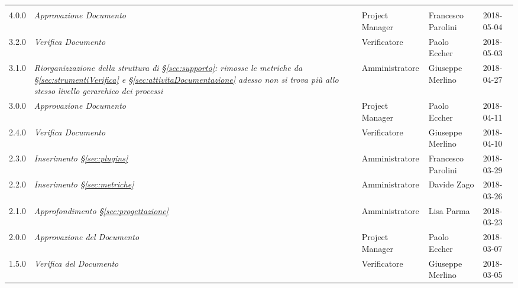 
\section*{}

\begin{longtable}[H]{C{2cm}|C{4cm}|C{3cm}|C{3cm}|R{2cm}}

		
		
			 &  & &  & \\
		
		
		4.0.0  & \emph{Approvazione Documento} & Project Manager & Francesco Parolini &  2018-05-04 \\
		\hline

		3.2.0  & \emph{Verifica Documento} & Verificatore & Paolo Eccher &  2018-05-03 \\
		\hline

		3.1.0  & \emph{Riorganizzazione della struttura di §\ref{sec:supporto}: rimosse le metriche da §\ref{sec:strumentiVerifica} e §\ref{sec:attivitaDocumentazione} adesso non si trova più allo stesso livello gerarchico dei processi  } & Amministratore & Giuseppe Merlino &  2018-04-27 \\
		\hline
				
		3.0.0  & \emph{Approvazione Documento} & Project Manager & Paolo Eccher &  2018-04-11 \\
		\hline
		
			2.4.0  & \emph{Verifica Documento} & Verificatore & Giuseppe Merlino &  2018-04-10 \\
		\hline
		
		2.3.0  & \emph{Inserimento §\ref{sec:plugins}} & Amministratore & Francesco Parolini &  2018-03-29 \\
		\hline

		2.2.0  & \emph{Inserimento §\ref{sec:metriche}} & Amministratore & Davide Zago &  2018-03-26 \\
		\hline
		
		2.1.0  & \emph{Approfondimento §\ref{sec:progettazione}} & Amministratore & Lisa Parma &  2018-03-23 \\
		\hline
		
		2.0.0  & \emph{Approvazione del Documento} & Project Manager & Paolo Eccher&  2018-03-07 \\
		\hline
		
		1.5.0  &  \emph{Verifica del Documento} & Verificatore & Giuseppe Merlino & 2018-03-05 \\
		\hline
		

\end{longtable}
